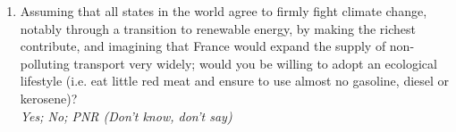 \documentclass[english,5p,authoryear]{elsarticle}
\begin{document}
\begin{appendices}
\begin{enumerate}[resume,leftmargin=*]
{No, I think climate change is not a real problem; I have already adopted
a sustainable way of life; I try, but I have trouble changing my habits} 
\item Assuming that all states in the world agree to firmly fight climate
change, notably through a transition to renewable energy, by making the richest contribute, and imagining that France would expand the
supply of non-polluting transport very widely; would you be willing
to adopt an ecological lifestyle (i.e. eat little red meat and ensure
to use almost no gasoline, diesel or kerosene)? \textit{}\\
\textit{Yes; No; PNR (Don't know, don't say) }
\end{enumerate}




\end{appendices}
\end{document}
